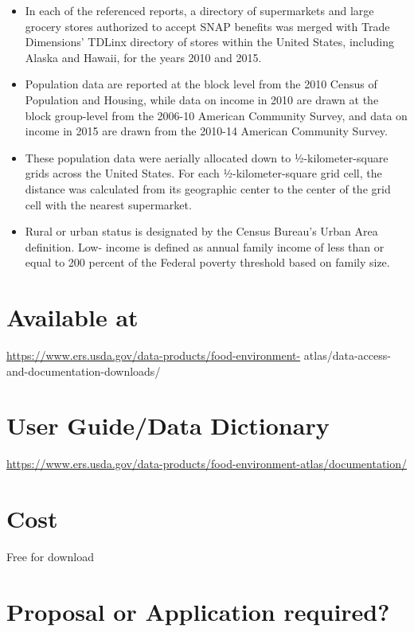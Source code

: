 \documentclass[
]{book}
\providecommand{\tightlist}{%
  \setlength{\itemsep}{0pt}\setlength{\parskip}{0pt}}
\begin{document}
\begin{itemize}
\tightlist
\item
  In each of the referenced reports, a directory of supermarkets and large grocery stores authorized to accept SNAP benefits was merged with Trade Dimensions' TDLinx directory of stores within the United States, including Alaska and Hawaii, for the years 2010 and 2015.
\item
  Population data are reported at the block level from the 2010 Census of Population and Housing, while data on income in 2010 are drawn at the block group-level from the 2006-10 American Community Survey, and data on income in 2015 are drawn from the 2010-14 American Community Survey.
\item
  These population data were aerially allocated down to ½-kilometer-square grids across the United States. For each ½-kilometer-square grid cell, the distance was calculated from its geographic center to the center of the grid cell with the nearest supermarket.
\item
  Rural or urban status is designated by the Census Bureau's Urban Area definition. Low- income is defined as annual family income of less than or equal to 200 percent of the Federal poverty threshold based on family size.
\end{itemize}

\hypertarget{available-at-27}{%
\section{Available at}\label{available-at-27}}

\url{https://www.ers.usda.gov/data-products/food-environment-} atlas/data-access-and-documentation-downloads/

\hypertarget{user-guidedata-dictionary-27}{%
\section{User Guide/Data Dictionary}\label{user-guidedata-dictionary-27}}

\url{https://www.ers.usda.gov/data-products/food-environment-atlas/documentation/}

\hypertarget{cost-27}{%
\section{Cost}\label{cost-27}}

Free for download

\hypertarget{proposal-or-application-required-27}{%
\section{Proposal or Application required?}\label{proposal-or-application-required-27}}
\end{document}
